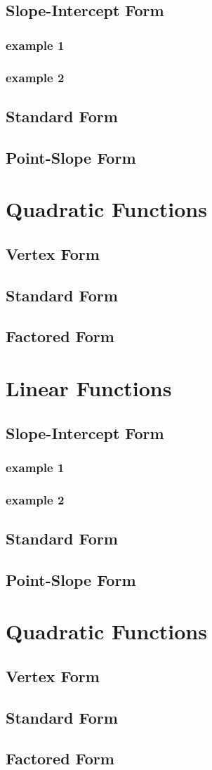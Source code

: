\documentclass[11pt]{article}
\begin{document}
	\subsection{Slope-Intercept Form}
		\subsubsection{example 1}
		\subsubsection{example 2}
	\subsection{Standard Form}
	\subsection{Point-Slope Form}
\section{Quadratic Functions}
	\subsection{Vertex Form}
	\subsection{Standard Form}
	\subsection{Factored Form}

\section*{Linear Functions}
	\subsection*{Slope-Intercept Form}
		\subsubsection*{example 1}
		\subsubsection{example 2}
	\subsection*{Standard Form}
	\subsection{Point-Slope Form}
\section*{Quadratic Functions}
	\subsection{Vertex Form}
	\subsection*{Standard Form}
	\subsection{Factored Form}
\end{document}
